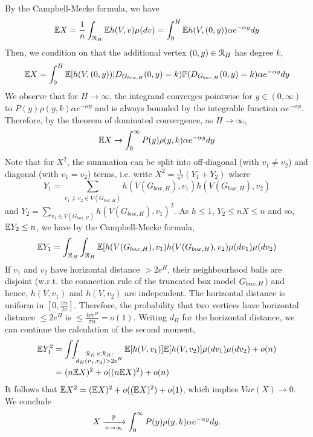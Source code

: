 By the Campbell-Mecke formula, we have
\begin{align*}
\mathbb{E} X = \frac{1}{n}\int_{{\mathcal R}_H} \mathbb{E} h(V,v) \mu(dv) = \int_0^H \mathbb{E} h(V,(0,y))\alpha e^{-\alpha y} dy
\end{align*}
Then, we condition on that the additional vertex $(0,y) \in {\mathcal R}_H$ has degree $k$,
\begin{align*}
\mathbb{E} X = \int_0^H \mathbb{E}[h(V,(0,y))|D_{G_{box,H}}(0,y)=k)\mathbb{P}(D_{G_{box,H}}(0,y)=k)\alpha e^{-\alpha y}dy
\end{align*}
We observe that for $H \rightarrow \infty$, the integrand converges pointwise for $y \in (0,\infty)$ to $P(y)\rho(y,k)\alpha e^{-\alpha y}$ and is always bounded by the integrable function $\alpha e^{-\alpha y}$.
Therefore, by the theorem of dominated convergence, as $H \rightarrow \infty$,
\begin{align*}
\mathbb{E} X \rightarrow \int_0^\infty P(y)\rho(y,k)\alpha e^{-\alpha y}dy
\end{align*}
Note that for $X^2$, the summation can be split into off-diagonal (with $v_1 \not = v_2$) and diagonal (with $v_1=v_2$) terms, i.e. write $X^2 = \frac{1}{n^2}(Y_1+Y_2)$ where 
$$Y_1 = \sum_{v_1 \not = v_2 \in V(G_{box,H})} h(V(G_{box,H}),v_1)h(V(G_{box,H}),v_2)$$ and $Y_2 = \sum_{v_1 \in V(G_{box,H})} h(V(G_{box,H}),v_1)^2$. As $h \leq 1$, $Y_2 \leq n X\leq n$ and so, $\mathbb{E} Y_2 \leq n$, we have by the Campbell-Mecke formula,
\begin{align*}
\mathbb{E} Y_1 = \int_{{\mathcal R}_H} \int_{{\mathcal R}_H} \mathbb{E}[h(V(G_{box,H}),v_1)h(V(G_{box,H}),v_2)\mu(dv_1)\mu(dv_2)
\end{align*}
If $v_1$ and $v_2$ have horizontal distance $>2e^H$, their neighbourhood balls are disjoint (w.r.t. the connection rule of the truncated box model $G_{box,H}$) and hence, $h(V,v_1)$ and $h(V,v_2)$ are independent. The horizontal distance is uniform in $[0,\frac{\pi n}{2\nu}]$. Therefore, the probability that two vertices have horizontal distance $\leq 2e^H$ is $\leq \frac{4\nu e^H}{\pi n} = o(1)$. Writing $d_H$ for the horizontal distance, we can continue the calculation of the second moment,
\begin{align*}
\mathbb{E} Y_1^2 &= \int_{} \int_{\substack{{\mathcal R}_H\times {\mathcal R}_H:\\ d_H(v_1,v_2)>2 e^H}} \mathbb{E}[ h(V,v_1)]\mathbb{E}[h(V,v_2)]\mu(dv_1)\mu(dv_2)+o(n) \\
&= (n\mathbb{E} X)^2+o((n\mathbb{E} X)^2)+o(n)
\end{align*}
It follows that $\mathbb{E} X^2 = (\mathbb{E} X)^2 + o((\mathbb{E} X)^2)+o(1)$, which implies $Var(X) \rightarrow 0$. We conclude
$$X \xrightarrow[n\rightarrow\infty]{\mathbb{P}} \int_0^\infty P(y)\rho(y,k)\alpha e^{-\alpha y}dy.$$
